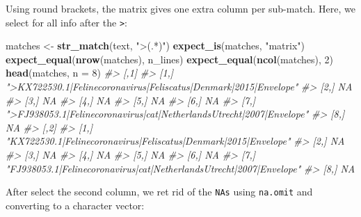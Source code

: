 \documentclass[]{book}
\newenvironment{Shaded}{}{}
\newcommand{\CommentTok}[1]{\textcolor[rgb]{0.38,0.63,0.69}{\textit{#1}}}
\newcommand{\DataTypeTok}[1]{\textcolor[rgb]{0.56,0.13,0.00}{#1}}
\newcommand{\DecValTok}[1]{\textcolor[rgb]{0.25,0.63,0.44}{#1}}
\newcommand{\KeywordTok}[1]{\textcolor[rgb]{0.00,0.44,0.13}{\textbf{#1}}}
\newcommand{\NormalTok}[1]{#1}
\newcommand{\StringTok}[1]{\textcolor[rgb]{0.25,0.44,0.63}{#1}}
\begin{document}
Using round brackets, the matrix gives one extra column per sub-match.
Here, we select for all info after the \texttt{\textgreater{}}:

\begin{Shaded}
\begin{Highlighting}[]
\NormalTok{matches <-}\StringTok{ }\KeywordTok{str_match}\NormalTok{(text, }\StringTok{">(.*)"}\NormalTok{)}
\KeywordTok{expect_is}\NormalTok{(matches, }\StringTok{"matrix"}\NormalTok{)}
\KeywordTok{expect_equal}\NormalTok{(}\KeywordTok{nrow}\NormalTok{(matches), n_lines)}
\KeywordTok{expect_equal}\NormalTok{(}\KeywordTok{ncol}\NormalTok{(matches), }\DecValTok{2}\NormalTok{)}
\KeywordTok{head}\NormalTok{(matches, }\DataTypeTok{n =} \DecValTok{8}\NormalTok{)}
\CommentTok{#>      [,1]                                                                }
\CommentTok{#> [1,] ">KX722530.1|Felinecoronavirus|Feliscatus|Denmark|2015|Envelope"    }
\CommentTok{#> [2,] NA                                                                  }
\CommentTok{#> [3,] NA                                                                  }
\CommentTok{#> [4,] NA                                                                  }
\CommentTok{#> [5,] NA                                                                  }
\CommentTok{#> [6,] NA                                                                  }
\CommentTok{#> [7,] ">FJ938053.1|Felinecoronavirus|cat|NetherlandsUtrecht|2007|Envelope"}
\CommentTok{#> [8,] NA                                                                  }
\CommentTok{#>      [,2]                                                               }
\CommentTok{#> [1,] "KX722530.1|Felinecoronavirus|Feliscatus|Denmark|2015|Envelope"    }
\CommentTok{#> [2,] NA                                                                 }
\CommentTok{#> [3,] NA                                                                 }
\CommentTok{#> [4,] NA                                                                 }
\CommentTok{#> [5,] NA                                                                 }
\CommentTok{#> [6,] NA                                                                 }
\CommentTok{#> [7,] "FJ938053.1|Felinecoronavirus|cat|NetherlandsUtrecht|2007|Envelope"}
\CommentTok{#> [8,] NA}
\end{Highlighting}
\end{Shaded}

After select the second column, we ret rid of the \texttt{NAs} using \texttt{na.omit}
and converting to a character vector:
\end{document}
